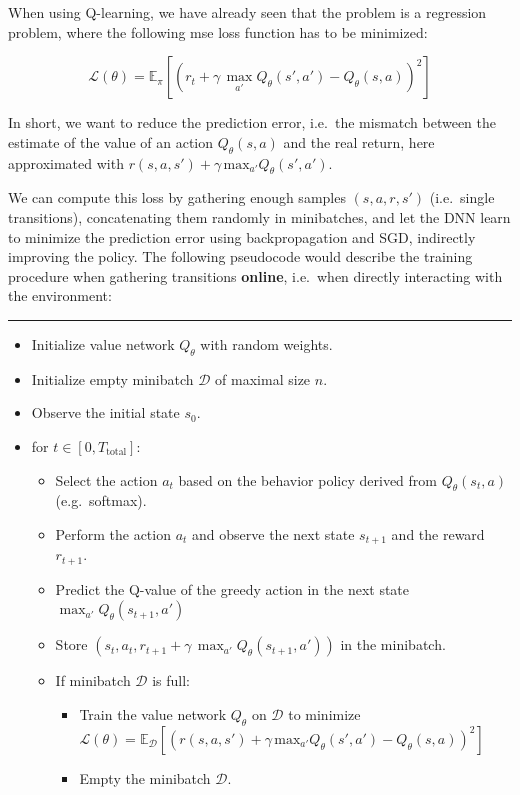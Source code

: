 \documentclass[
  letterpaper,
  DIV=11,
  numbers=noendperiod]{scrreprt}
\providecommand{\tightlist}{%
  \setlength{\itemsep}{0pt}\setlength{\parskip}{0pt}}\usepackage{longtable,booktabs,array}
\begin{document}
When using Q-learning, we have already seen that the problem is a
regression problem, where the following mse loss function has to be
minimized:

\[
    \mathcal{L}(\theta) = \mathbb{E}_\pi[(r_t + \gamma \, \max_{a'} Q_\theta(s', a') - Q_\theta(s, a))^2]
\]

In short, we want to reduce the prediction error, i.e.~the mismatch
between the estimate of the value of an action \(Q_\theta(s, a)\) and
the real return, here approximated with
\(r(s, a, s') + \gamma \, \text{max}_{a'} Q_\theta(s', a')\).

We can compute this loss by gathering enough samples \((s, a, r, s')\)
(i.e.~single transitions), concatenating them randomly in minibatches,
and let the DNN learn to minimize the prediction error using
backpropagation and SGD, indirectly improving the policy. The following
pseudocode would describe the training procedure when gathering
transitions \textbf{online}, i.e.~when directly interacting with the
environment:

\begin{center}\rule{0.5\linewidth}{0.5pt}\end{center}

\begin{itemize}
\tightlist
\item
  Initialize value network \(Q_{\theta}\) with random weights.
\item
  Initialize empty minibatch \(\mathcal{D}\) of maximal size \(n\).
\item
  Observe the initial state \(s_0\).
\item
  for \(t \in [0, T_\text{total}]\):

  \begin{itemize}
  \tightlist
  \item
    Select the action \(a_t\) based on the behavior policy derived from
    \(Q_\theta(s_t, a)\) (e.g.~softmax).
  \item
    Perform the action \(a_t\) and observe the next state \(s_{t+1}\)
    and the reward \(r_{t+1}\).
  \item
    Predict the Q-value of the greedy action in the next state
    \(\max_{a'} Q_\theta(s_{t+1}, a')\)
  \item
    Store
    \((s_t, a_t, r_{t+1} + \gamma \, \max_{a'} Q_\theta(s_{t+1}, a'))\)
    in the minibatch.
  \item
    If minibatch \(\mathcal{D}\) is full:

    \begin{itemize}
    \tightlist
    \item
      Train the value network \(Q_{\theta}\) on \(\mathcal{D}\) to
      minimize
      \(\mathcal{L}(\theta) = \mathbb{E}_\mathcal{D}[(r(s, a, s') + \gamma \, \text{max}_{a'} Q_\theta(s', a') - Q_\theta(s, a))^2]\)
    \item
      Empty the minibatch \(\mathcal{D}\).
    \end{itemize}
  \end{itemize}
\end{itemize}
\end{document}
